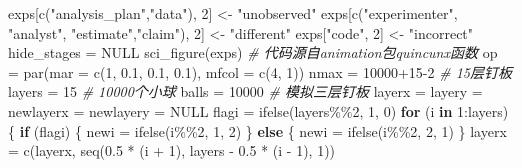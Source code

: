 \documentclass[]{tufte-book}
\newenvironment{Shaded}{}{}
\newcommand{\AttributeTok}[1]{\textcolor[rgb]{0.49,0.56,0.16}{#1}}
\newcommand{\CommentTok}[1]{\textcolor[rgb]{0.38,0.63,0.69}{\textit{#1}}}
\newcommand{\ConstantTok}[1]{\textcolor[rgb]{0.53,0.00,0.00}{#1}}
\newcommand{\ControlFlowTok}[1]{\textcolor[rgb]{0.00,0.44,0.13}{\textbf{#1}}}
\newcommand{\DecValTok}[1]{\textcolor[rgb]{0.25,0.63,0.44}{#1}}
\newcommand{\FloatTok}[1]{\textcolor[rgb]{0.25,0.63,0.44}{#1}}
\newcommand{\FunctionTok}[1]{\textcolor[rgb]{0.02,0.16,0.49}{#1}}
\newcommand{\NormalTok}[1]{#1}
\newcommand{\OtherTok}[1]{\textcolor[rgb]{0.00,0.44,0.13}{#1}}
\newcommand{\SpecialCharTok}[1]{\textcolor[rgb]{0.25,0.44,0.63}{#1}}
\newcommand{\StringTok}[1]{\textcolor[rgb]{0.25,0.44,0.63}{#1}}
\begin{document}
\begin{Shaded}
\begin{Highlighting}[]
\NormalTok{exps[}\FunctionTok{c}\NormalTok{(}\StringTok{"analysis\_plan"}\NormalTok{,}\StringTok{"data"}\NormalTok{), }\DecValTok{2}\NormalTok{] }\OtherTok{\textless{}{-}} \StringTok{"unobserved"}
\NormalTok{exps[}\FunctionTok{c}\NormalTok{(}\StringTok{"experimenter"}\NormalTok{, }\StringTok{"analyst"}\NormalTok{, }\StringTok{"estimate"}\NormalTok{,}\StringTok{"claim"}\NormalTok{), }\DecValTok{2}\NormalTok{] }\OtherTok{\textless{}{-}} \StringTok{"different"}
\NormalTok{exps[}\StringTok{"code"}\NormalTok{, }\DecValTok{2}\NormalTok{] }\OtherTok{\textless{}{-}} \StringTok{"incorrect"}
\NormalTok{hide\_stages }\OtherTok{=} \ConstantTok{NULL}
\FunctionTok{sci\_figure}\NormalTok{(exps)}
\CommentTok{\# 代码源自animation包quincunx函数}
\NormalTok{op }\OtherTok{=} \FunctionTok{par}\NormalTok{(}\AttributeTok{mar =} \FunctionTok{c}\NormalTok{(}\DecValTok{1}\NormalTok{, }\FloatTok{0.1}\NormalTok{, }\FloatTok{0.1}\NormalTok{, }\FloatTok{0.1}\NormalTok{), }\AttributeTok{mfcol =} \FunctionTok{c}\NormalTok{(}\DecValTok{4}\NormalTok{, }\DecValTok{1}\NormalTok{))}
\NormalTok{nmax }\OtherTok{=} \DecValTok{10000}\SpecialCharTok{+}\DecValTok{15{-}2}
\CommentTok{\# 15层钉板}
\NormalTok{layers }\OtherTok{=} \DecValTok{15}
\CommentTok{\# 10000个小球}
\NormalTok{balls }\OtherTok{=} \DecValTok{10000}
\CommentTok{\# 模拟三层钉板}
\NormalTok{layerx }\OtherTok{=}\NormalTok{ layery }\OtherTok{=}\NormalTok{ newlayerx }\OtherTok{=}\NormalTok{ newlayery }\OtherTok{=} \ConstantTok{NULL}
\NormalTok{flagi }\OtherTok{=} \FunctionTok{ifelse}\NormalTok{(layers}\SpecialCharTok{\%\%}\DecValTok{2}\NormalTok{, }\DecValTok{1}\NormalTok{, }\DecValTok{0}\NormalTok{)}
\ControlFlowTok{for}\NormalTok{ (i }\ControlFlowTok{in} \DecValTok{1}\SpecialCharTok{:}\NormalTok{layers) \{}
        \ControlFlowTok{if}\NormalTok{ (flagi) \{}
\NormalTok{                newi }\OtherTok{=} \FunctionTok{ifelse}\NormalTok{(i}\SpecialCharTok{\%\%}\DecValTok{2}\NormalTok{, }\DecValTok{1}\NormalTok{, }\DecValTok{2}\NormalTok{)}
\NormalTok{        \}}
        \ControlFlowTok{else}\NormalTok{ \{}
\NormalTok{                newi }\OtherTok{=} \FunctionTok{ifelse}\NormalTok{(i}\SpecialCharTok{\%\%}\DecValTok{2}\NormalTok{, }\DecValTok{2}\NormalTok{, }\DecValTok{1}\NormalTok{)}
\NormalTok{        \}}
\NormalTok{        layerx }\OtherTok{=} \FunctionTok{c}\NormalTok{(layerx, }\FunctionTok{seq}\NormalTok{(}\FloatTok{0.5} \SpecialCharTok{*}\NormalTok{ (i }\SpecialCharTok{+} \DecValTok{1}\NormalTok{), layers }\SpecialCharTok{{-}} \FloatTok{0.5} \SpecialCharTok{*} 
\NormalTok{                                       (i }\SpecialCharTok{{-}} \DecValTok{1}\NormalTok{), }\DecValTok{1}\NormalTok{))}

\end{Highlighting}
\end{Shaded}
\end{document}
